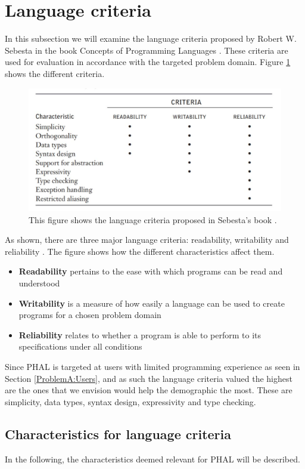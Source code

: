 \section{Language criteria}
In this subsection we will examine the language criteria proposed by Robert W. Sebesta in the book Concepts of Programming Languages \cite{Sebesta}. These criteria are used for evaluation in accordance with the targeted problem domain. Figure \ref{fig:LanguageCriteria} shows the different criteria. 

\begin{figure}[H]
\centering
  \includegraphics[scale=0.8]{figures/Analysis/sebestecriteria.JPG}
  \caption{This figure shows the language criteria proposed in Sebesta's book \cite{Sebesta}.}
  \label{fig:LanguageCriteria}
\end{figure}
\noindent
As shown, there are three major language criteria: readability, writability and reliability \cite{Sebesta}. The figure shows how the different characteristics affect them.
\begin{itemize}
    \item \textbf{Readability} pertains to the ease with which programs can be read and understood
    \item \textbf{Writability} is a measure of how easily a language can be used to create programs for a chosen problem domain
    \item \textbf{Reliability} relates to whether a program is able to perform to its specifications under all conditions
\end{itemize}
Since PHAL is targeted at users with limited programming experience as seen in Section \ref{ProblemA:Users}, and as such the language criteria valued the highest are the ones that we envision would help the demographic the most. These are simplicity, data types, syntax design, expressivity and type checking.

\subsection{Characteristics for language criteria}\label{subsec:CharacteristicsForLanguage}
In the following, the characteristics deemed relevant for PHAL will be described.

